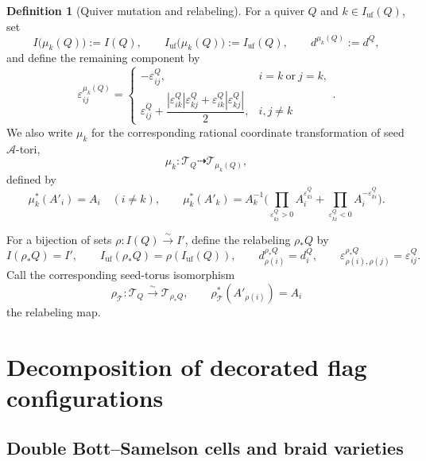 \documentclass[10pt,a4paper]{article}
\theoremstyle{definition}
\newtheorem{definition}[theorem]{Definition}
\theoremstyle{remark}
\newcommand{\Tcal}{\mathcal T}
\newcommand{\eps}{\varepsilon}
\begin{document}
\begin{definition}[Quiver mutation and relabeling]
\label{def:mutation-relabeling}
For a quiver \(Q\) and \(k\in I_{\mathrm{uf}}(Q)\), set
\[
 I\bigl(\mu_k(Q)\bigr):=I(Q),\qquad
 I_{\mathrm{uf}}\bigl(\mu_k(Q)\bigr):=I_{\mathrm{uf}}(Q),\qquad
 d^{\mu_k(Q)}:=d^Q,
\]
and define the remaining component by
\[
 \eps^{\mu_k(Q)}_{ij}
 =
 \begin{cases}
  -\eps^Q_{ij},
    &i=k\ \text{or}\ j=k,\\[1mm]
  \eps^Q_{ij}
  +\dfrac{|\eps^Q_{ik}|\eps^Q_{kj}
          +\eps^Q_{ik}|\eps^Q_{kj}|}{2},
    &i,j\ne k
 \end{cases}.
\]
We also write \(\mu_k\) for the corresponding rational coordinate
transformation of seed \(\mathcal A\)-tori,
\[
 \mu_k:\Tcal_Q\dashrightarrow\Tcal_{\mu_k(Q)},
\]
defined by
\[
 \mu_k^*(A'_i)=A_i\quad(i\ne k),\qquad
 \mu_k^*(A'_k)
 =
 A_k^{-1}\bigg(
  \prod_{\eps^Q_{ki}>0}A_i^{\eps^Q_{ki}}
  +
  \prod_{\eps^Q_{ki}<0}A_i^{-\eps^Q_{ki}}
 \bigg).
\]

For a bijection of sets \(\rho:I(Q)\xrightarrow{\sim}I'\), define the
relabeling \(\rho_*Q\) by
\[
 I(\rho_*Q)=I',\qquad
 I_{\mathrm{uf}}(\rho_*Q)=\rho(I_{\mathrm{uf}}(Q)),\qquad
 d^{\rho_*Q}_{\rho(i)}=d^Q_i,\qquad
 \eps^{\rho_*Q}_{\rho(i),\rho(j)}=\eps^Q_{ij}.
\]
Call the corresponding seed-torus isomorphism
\[
 \rho_{\Tcal}:\Tcal_Q\xrightarrow{\sim}\Tcal_{\rho_*Q},
 \qquad
 \rho_{\Tcal}^*(A'_{\rho(i)})=A_i
\]
the relabeling map.
\end{definition}

\section{Decomposition of decorated flag configurations}
\label{sec:flag-product}

\subsection{Double Bott--Samelson cells and braid varieties}
\label{subsec:double-moduli}
\end{document}
